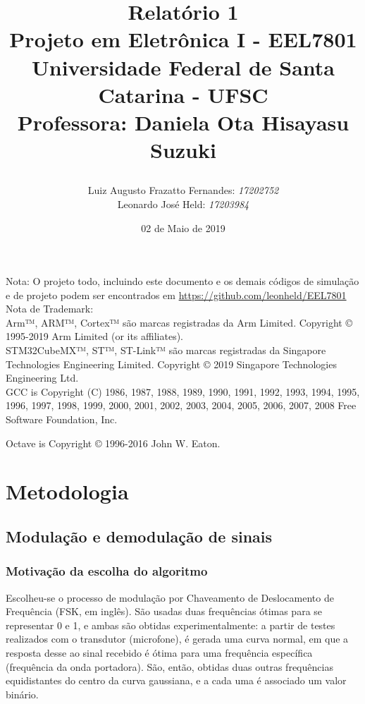 \documentclass[11pt,a4paper]{report}
\title{Relatório 1  \\
	Projeto em Eletrônica I - EEL7801 \\ \vfill
	\normalsize{Universidade Federal de Santa Catarina - UFSC \\
		Professora: Daniela Ota Hisayasu Suzuki}
	\author{
		{Luiz Augusto Frazatto Fernandes: \it{17202752}} \\
		{Leonardo José Held: \it{17203984}}
	}
}
\date{02 de Maio de 2019}
\begin{document}
	

	\maketitle
		\newpage Nota: O projeto todo, incluindo este documento e os demais códigos de simulação e de projeto podem ser encontrados em \url{https://github.com/leonheld/EEL7801}
	\\
	
	Nota de Trademark: \\
	
	Arm™, ARM™, Cortex™ são marcas registradas da Arm Limited.
	Copyright © 1995-2019 Arm Limited (or its affiliates).\\
	
	STM32CubeMX™, ST™, ST-Link™ são marcas registradas da Singapore Technologies Engineering Limited.
	Copyright © 2019 Singapore Technologies Engineering Ltd.\\
	
	GCC is Copyright (C) 1986, 1987, 1988, 1989, 1990, 1991, 1992, 1993, 1994,
	1995, 1996, 1997, 1998, 1999, 2000, 2001, 2002, 2003, 2004, 2005, 2006, 2007,
	2008 Free Software Foundation, Inc.
	
	Octave is Copyright © 1996-2016 John W. Eaton. 
	
	\setcounter{chapter}{0}
	\chapter{Metodologia}
	\section{Modulação e demodulação de sinais}
	\subsection{Motivação da escolha do algoritmo}
	
	Escolheu-se o processo de modulação por Chaveamento de Deslocamento de Frequência (FSK, em inglês). São usadas duas frequências ótimas para se representar 0 e 1, e ambas são obtidas experimentalmente: a partir de testes realizados com o transdutor (microfone), é gerada uma curva normal, em que a resposta desse ao sinal recebido é ótima para uma frequência específica (frequência da onda portadora). São, então, obtidas duas outras frequências equidistantes do centro da curva gaussiana, e a cada uma é associado um valor binário.
	
\end{document}
